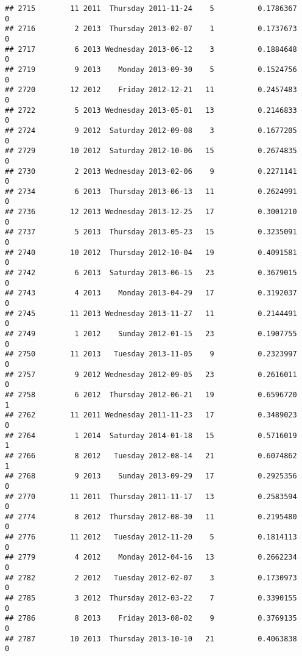 \documentclass[
]{article}
\begin{document}
\begin{verbatim}
## 2715        11 2011  Thursday 2011-11-24    5          0.1786367             0
## 2716         2 2013  Thursday 2013-02-07    1          0.1737673             0
## 2717         6 2013 Wednesday 2013-06-12    3          0.1884648             0
## 2719         9 2013    Monday 2013-09-30    5          0.1524756             0
## 2720        12 2012    Friday 2012-12-21   11          0.2457483             0
## 2722         5 2013 Wednesday 2013-05-01   13          0.2146833             0
## 2724         9 2012  Saturday 2012-09-08    3          0.1677205             0
## 2729        10 2012  Saturday 2012-10-06   15          0.2674835             0
## 2730         2 2013 Wednesday 2013-02-06    9          0.2271141             0
## 2734         6 2013  Thursday 2013-06-13   11          0.2624991             0
## 2736        12 2013 Wednesday 2013-12-25   17          0.3001210             0
## 2737         5 2013  Thursday 2013-05-23   15          0.3235091             0
## 2740        10 2012  Thursday 2012-10-04   19          0.4091581             0
## 2742         6 2013  Saturday 2013-06-15   23          0.3679015             0
## 2743         4 2013    Monday 2013-04-29   17          0.3192037             0
## 2745        11 2013 Wednesday 2013-11-27   11          0.2144491             0
## 2749         1 2012    Sunday 2012-01-15   23          0.1907755             0
## 2750        11 2013   Tuesday 2013-11-05    9          0.2323997             0
## 2757         9 2012 Wednesday 2012-09-05   23          0.2616011             0
## 2758         6 2012  Thursday 2012-06-21   19          0.6596720             1
## 2762        11 2011 Wednesday 2011-11-23   17          0.3489023             0
## 2764         1 2014  Saturday 2014-01-18   15          0.5716019             1
## 2766         8 2012   Tuesday 2012-08-14   21          0.6074862             1
## 2768         9 2013    Sunday 2013-09-29   17          0.2925356             0
## 2770        11 2011  Thursday 2011-11-17   13          0.2583594             0
## 2774         8 2012  Thursday 2012-08-30   11          0.2195480             0
## 2776        11 2012   Tuesday 2012-11-20    5          0.1814113             0
## 2779         4 2012    Monday 2012-04-16   13          0.2662234             0
## 2782         2 2012   Tuesday 2012-02-07    3          0.1730973             0
## 2785         3 2012  Thursday 2012-03-22    7          0.3390155             0
## 2786         8 2013    Friday 2013-08-02    9          0.3769135             0
## 2787        10 2013  Thursday 2013-10-10   21          0.4063838             0

\end{verbatim}
\end{document}
